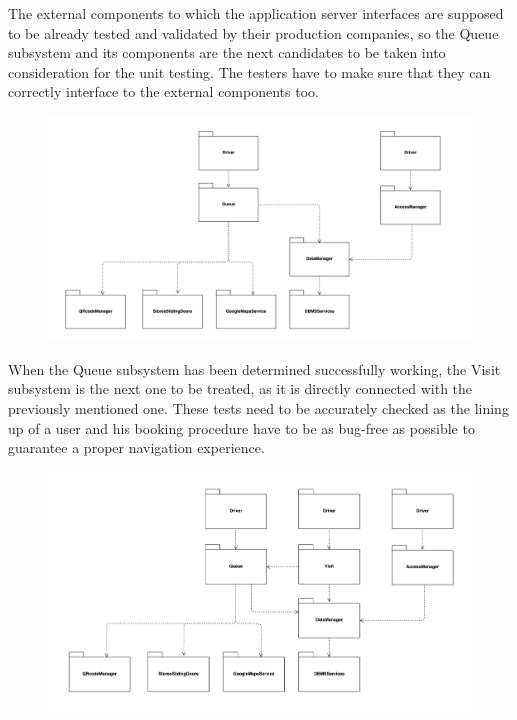 \documentclass[]{article}
\begin{document}
The external components to which the application server interfaces are supposed to be already tested and validated by their production companies, so the Queue subsystem and its components are the next candidates to be taken into consideration for the unit testing. The testers have to make sure that they can correctly interface to the external components too.
				\begin{figure}[H]
					\centering
					\includegraphics[scale=0.55]{Testing/Testing3.png}
					\caption{}
					\label{fig:Testing}
				\end{figure}

When the Queue subsystem has been determined successfully working, the Visit subsystem is the next one to be treated, as it is directly connected with the previously mentioned one. These tests need to be accurately checked as the lining up of a user and his booking procedure have to be as bug-free as possible to guarantee a proper navigation experience.
				\begin{figure}[H]
					\centering
					\includegraphics[scale=0.5]{Testing/Testing4.png}
					\caption{}
					\label{fig:Testing}
				\end{figure}
\end{document}
